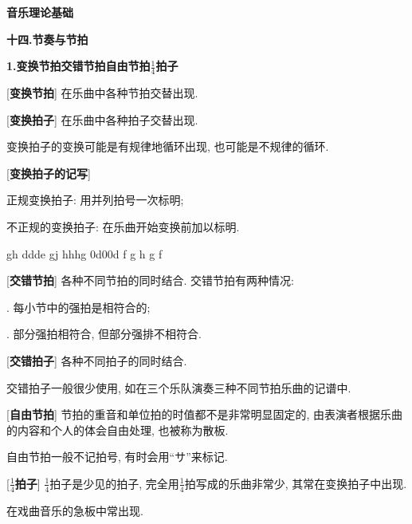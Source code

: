 

\begin{center} 
 \Large \textbf{音乐理论基础}\par
 \textbf{十四.节奏与节拍}
\end{center}

\large 
\begin{center}
 \textbf{1.变换节拍\quad 交错节拍\quad 自由节拍\quad $\frac{1}{4}$拍子}\\
\end{center}

[\textbf{变换节拍}] 在乐曲中各种节拍交替出现.\par

[\textbf{变换拍子}] 在乐曲中各种拍子交替出现.\par
\qquad 变换拍子的变换可能是有规律地循环出现, 也可能是不规律的循环.\par

[\textbf{变换拍子的记写}] \par
\qquad 正规变换拍子: 用并列拍号一次标明;\par
\qquad 不正规的变换拍子: 在乐曲开始变换前加以标明.\par
{}
\startextract
\Notes \Dqbu gh \Qqbbu ddde \Dqbu gj \Qqbbu hhhg\en
\zendextract
{}
\startextract
\Notes \ibu0d0\qbp0d \qa f\en
{}\changecontext
\notesp {}\en
{}\changecontext
\notesp \ca g \ca h \ca g \ca f\en
\zendextract

[\textbf{交错节拍}] 各种不同节拍的同时结合. 交错节拍有两种情况:\par
{}. 每小节中的强拍是相符合的;\par
{}. 部分强拍相符合, 但部分强排不相符合.\par

[\textbf{交错拍子}] 各种不同拍子的同时结合.\par
\qquad 交错拍子一般很少使用, 如在三个乐队演奏三种不同节拍乐曲的记谱中.\par

[\textbf{自由节拍}] 节拍的重音和单位拍的时值都不是非常明显固定的, 由表演者根据乐曲的内容和个人的体会自由处理, 也被称为散板.\par
\qquad 自由节拍一般不记拍号, 有时会用``サ''来标记.

[\textbf{$\frac{1}{4}$拍子}] $\frac{1}{4}$拍子是少见的拍子, 完全用$\frac{1}{4}$拍写成的乐曲非常少, 其常在变换拍子中出现. \par
\qquad 在戏曲音乐的急板中常出现.\par

